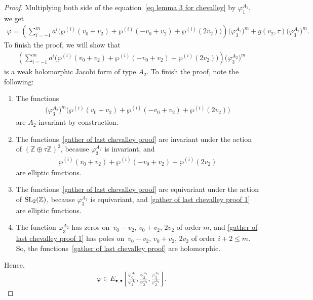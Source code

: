\documentclass[pdftex]{sigma}%
\numberwithin{equation}{section}
\begin{document}
\begin{proof}
Multiplying both side of the equation~\eqref{eq lemma 3 for chevalley} by $\varphi_1^{A_1}$, we get
\begin{gather*}%
\varphi= \left(\sum_{i=-1}^{m}\! a^i\big(\wp^{(i)}(v_0+v_{2})+\wp^{(i)}(-v_0+v_{2})+\wp^{(i)}(2v_2)\big)\! \right) \big(\varphi_3^{A_2}\big)^m +g(v_2,\tau) \big(\varphi_3^{A_2}\big)^m\!.\!\!
\end{gather*}
To finish the proof, we will show that
\begin{gather*}
 \left(\sum_{i=-1}^{m} a^i\big(\wp^{(i)}(v_0+v_{2})+\wp^{(i)}(-v_0+v_{2})+\wp^{(i)}(2v_2)\big) \right) \big(\varphi_3^{A_2}\big)^m
\end{gather*}
is a weak holomorphic Jacobi form of type $A_2$. To finish the proof, note the following:
\begin{enumerate}\itemsep=0pt
\item The functions
\begin{gather}\label{gather of last chevalley proof}
\big(\varphi_{3}^{A_2}\big)^m\big(\wp^{(i)}(v_0+v_{2})+\wp^{(i)}(-v_0+v_{2})+\wp^{(i)}(2v_2)\big)
\end{gather}
 are $A_{2}$-invariant by construction.
\item The functions~\eqref{gather of last chevalley proof} are invariant under the action of $(\mathbb{Z}\oplus\tau\mathbb{Z})^{2}$, because $\varphi_{3}^{A_{2}}$ is invariant, and
\begin{gather}\label{gather of last chevalley proof 1}
\wp^{(i)}(v_0+v_{2})+\wp^{(i)}(-v_0+v_{2})+\wp^{(i)}(2v_2)
\end{gather}
 are elliptic functions.
\item The functions~\eqref{gather of last chevalley proof} are equivariant under the action of ${\rm SL}_2(\mathbb{Z})$, because $\varphi_{3}^{A_{2}}$ is equivariant, and
\eqref{gather of last chevalley proof 1} are elliptic functions.
\item The function $\varphi_{3}^{A_{2}}$ has zeros on~$v_0-v_2$, $v_0+v_2$, $2v_2$ of order $m$, and
\eqref{gather of last chevalley proof 1} has poles on~$v_0-v_2$, $v_0+v_2$, $2v_2$ of order $i+2\leq m$. So, the functions~\eqref{gather of last chevalley proof} are holomorphic.
\end{enumerate}
Hence,
\begin{gather*}
\varphi \in E_{\bullet,\bullet}\left[\frac{\varphi_0^{A_{2}}} {\varphi_2^{A_1}},\frac{\varphi_2^{A_{2}}}{\varphi_2^{A_1}},\frac{\varphi_3^{A_{2}}}{\varphi_2^{A_1}}\right].
\tag*{\qed}
\end{gather*}\renewcommand{\qed}{}
\end{proof}
\end{document}
